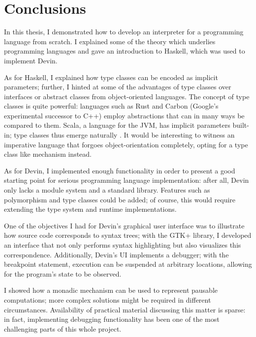 \documentclass[UdineBachThesis,american,11pt]{PhdThesis}
\begin{document}
  \chapter{Conclusions}

  In this thesis, I demonstrated how to develop an interpreter for a programming
  language from scratch. I explained some of the theory which underlies
  programming languages and gave an introduction to Haskell, which was used to
  implement Devin.

  As for Haskell, I explained how type classes can be encoded as implicit
  parameters; further, I hinted at some of the advantages of type classes over
  interfaces or abstract classes from object-oriented languages. The concept of
  type classes is quite powerful: languages such as Rust and Carbon (Google's
  experimental successor to C++) employ abstractions that can in many ways be
  compared to them. Scala, a language for the JVM, has implicit parameters
  built-in; type classes thus emerge naturally \cite{scala-type-classes}. It
  would be interesting to witness an imperative language that forgoes
  object-orientation completely, opting for a type class like mechanism instead.

  As for Devin, I implemented enough functionality in order to present a good
  starting point for serious programming language implementation: after all,
  Devin only lacks a module system and a standard library. Features such as
  polymorphism and type classes could be added; of course, this would require
  extending the type system and runtime implementations.

  One of the objectives I had for Devin's graphical user interface was to
  illustrate how source code corresponds to syntax trees; with the GTK+ library,
  I developed an interface that not only performs syntax highlighting but also
  visualizes this correspondence. Additionally, Devin's UI implements a
  debugger; with the breakpoint statement, execution can be suspended at
  arbitrary locations, allowing for the program's state to be observed.

  I showed how a monadic mechanism can be used to represent pausable
  computations; more complex solutions might be required in different
  circumstances. Availability of practical material discussing this matter is
  sparse: in fact, implementing debugging functionality has been one of the most
  challenging parts of this whole project.
\end{document}
